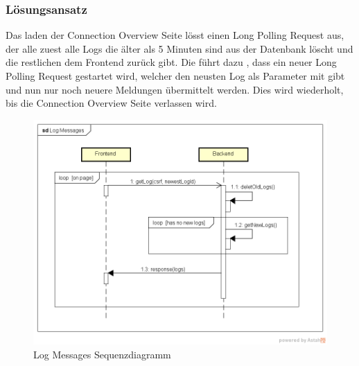 \subsubsection{Lösungsansatz}
Das laden der Connection Overview Seite lösst einen Long Polling Request aus, der alle zuest alle Logs die älter als 5 Minuten sind aus der Datenbank löscht und die restlichen dem Frontend zurück gibt. Die führt dazu , dass ein neuer Long Polling Request gestartet wird, welcher den neusten Log als Parameter mit gibt und nun nur noch neuere Meldungen übermittelt werden. Dies wird wiederholt, bis die Connection Overview Seite verlassen wird.
\medskip
\begin{figure}[H]
\centering
\includegraphics[width=400pt]{images/log_messages_seq.png}
\caption[Log Messages Sequenzdiagramm]{Log Messages Sequenzdiagramm}
\end{figure}